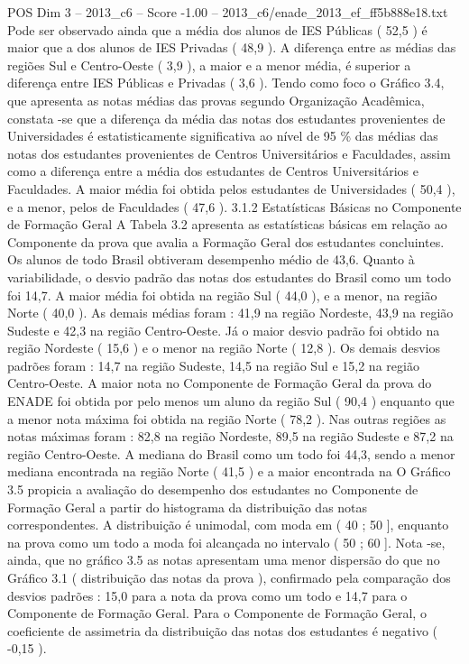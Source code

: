 \begin{textsample}{POS Dim 3 – 2013\_c6 – Score -1.00 – 2013\_c6/enade\_2013\_ef\_ff5b888e18.txt}
Pode ser observado ainda que a média dos alunos de IES Públicas ( 52,5 ) é maior que a dos alunos de IES Privadas ( 48,9 ).
A diferença entre as médias das regiões Sul e Centro-Oeste ( 3,9 ), a maior e a menor média, é superior a diferença entre IES Públicas e Privadas ( 3,6 ).
Tendo como foco o Gráfico 3.4, que apresenta as notas médias das provas segundo Organização Acadêmica, constata -se que a diferença da média das notas dos estudantes provenientes de Universidades é estatisticamente significativa ao nível de 95 \% das médias das notas dos estudantes provenientes de Centros Universitários e Faculdades, assim como a diferença entre a média dos estudantes de Centros Universitários e Faculdades.
A maior média foi obtida pelos estudantes de Universidades ( 50,4 ), e a menor, pelos de Faculdades ( 47,6 ). 3.1.2 Estatísticas Básicas no Componente de Formação Geral A Tabela 3.2 apresenta as estatísticas básicas em relação ao Componente da prova que avalia a Formação Geral dos estudantes concluintes.
Os alunos de todo Brasil obtiveram desempenho médio de 43,6.
Quanto à variabilidade, o desvio padrão das notas dos estudantes do Brasil como um todo foi 14,7.
A maior média foi obtida na região Sul ( 44,0 ), e a menor, na região Norte ( 40,0 ).
As demais médias foram : 41,9 na região Nordeste, 43,9 na região Sudeste e 42,3 na região Centro-Oeste.
Já o maior desvio padrão foi obtido na região Nordeste ( 15,6 ) e o menor na região Norte ( 12,8 ).
Os demais desvios padrões foram : 14,7 na região Sudeste, 14,5 na região Sul e 15,2 na região Centro-Oeste.
A maior nota no Componente de Formação Geral da prova do ENADE foi obtida por pelo menos um aluno da região Sul ( 90,4 ) enquanto que a menor nota máxima foi obtida na região Norte ( 78,2 ).
Nas outras regiões as notas máximas foram : 82,8 na região Nordeste, 89,5 na região Sudeste e 87,2 na região Centro-Oeste.
A mediana do Brasil como um todo foi 44,3, sendo a menor mediana encontrada na região Norte ( 41,5 ) e a maior encontrada na O Gráfico 3.5 propicia a avaliação do desempenho dos estudantes no Componente de Formação Geral a partir do histograma da distribuição das notas correspondentes.
A distribuição é unimodal, com moda em ( 40 ; 50 ], enquanto na prova como um todo a moda foi alcançada no intervalo ( 50 ; 60 ].
Nota -se, ainda, que no gráfico 3.5 as notas apresentam uma menor dispersão do que no Gráfico 3.1 ( distribuição das notas da prova ), confirmado pela comparação dos desvios padrões : 15,0 para a nota da prova como um todo e 14,7 para o Componente de Formação Geral.
Para o Componente de Formação Geral, o coeficiente de assimetria da distribuição das notas dos estudantes é negativo ( -0,15 ).

\end{textsample}
